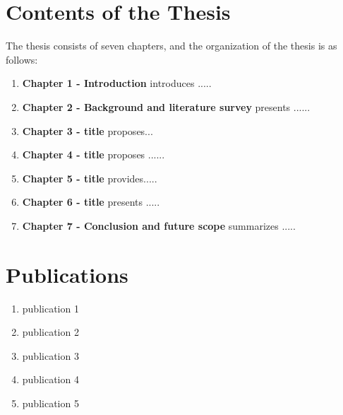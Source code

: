 \documentclass[12pt,a4paper,oneside]{report}
\begin{document}
\newpage
\section{Contents of the Thesis}
The thesis consists  of seven  chapters, and the organization of the thesis is as follows:
\begin{enumerate}
    \item \textbf{Chapter 1 - Introduction} introduces .....
    \item \textbf{Chapter 2 - Background and literature survey} presents ......
    \item \textbf{Chapter 3 - title} proposes...

    \item \textbf{Chapter 4 - title} proposes ......

    \item \textbf{Chapter 5 - title} provides.....

    \item \textbf{Chapter 6 - title}   presents .....
    
    \item \textbf{Chapter 7 - Conclusion and future scope} summarizes  .....

\end{enumerate}

\newpage
\section{Publications}
\begin{enumerate}
 \item publication 1
 \item publication 2
 \item publication 3
 \item publication 4
 \item publication 5

\end{enumerate}


\end{document}
